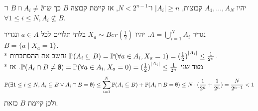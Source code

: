 \begin{example}
	יהיו $A_1, \dots, A_N$ קבוצות, $|A_i| \ge n$ ו־$N < 2^{n - 1}$, אז קיימת קבוצה $B$ כך ש־$B \cap A_i \ne \emptyset$ ו־$\forall 1 \le i \le N, A_i \not\subseteq B$.

	נגדיר $A = \bigcup_{i = 1}^N A_i$.
	יהיו $X_a \sim Ber(\frac{1}{2})$ בלתי תלויים לכל $a \in A$ ונגדיר $B = \{ a \mid X_a = 1 \}$. \\*
	נחשב את ההסתברות $\mathbb{P}(A_i \subseteq B) = \mathbb{P}(\forall a \in A_i, X_a = 1) = {(\frac{1}{2})}^{|A_i|} \le \frac{1}{2^n}$. \\*
	מצד שני $\mathbb{P}(A_i \cap B \ne \emptyset) = \mathbb{P}(\forall a \in A_i, X_a = 0) = {(\frac{1}{2})}^{|A_i|} \le \frac{1}{2^n}$.
	אז
	\[
		\mathbb{P}(\exists 1 \le i \le N, A_i \subseteq B \lor A_i \cap B = \emptyset)
		\le \sum_{i = 1}^{N} \mathbb{P}(A_i \subseteq B) + \mathbb{P}(A_i \cap B = \emptyset)
		\le N \cdot (\frac{1}{2^n} + \frac{1}{2^n})
		= \frac{N}{2^{n - 1}}
		< 1
	\]
	ולכן קיימת $B$ כזאת.
\end{example}

\listoftheorems[title=הגדרות ומשפטים,ignoreall,show={theorem,definition},swapnumber,onlynamed={proposition}]

